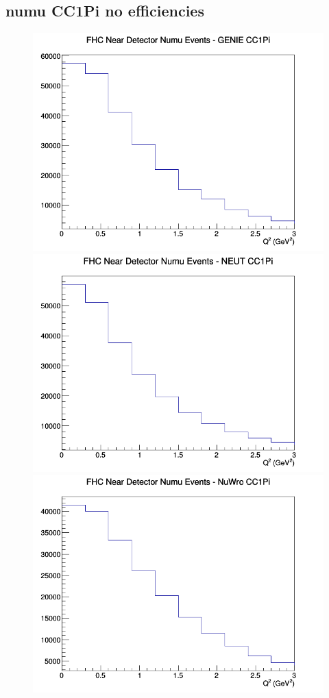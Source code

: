 \subsection{numu CC1Pi no efficiencies}
\begin{figure}[h]
\includegraphics[width=\linewidth]{Q2/nominal/CC1Pi_FHC_ND_numu_Q2_GENIE.png}
\endminipage
{}
\includegraphics[width=\linewidth]{Q2/nominal/CC1Pi_FHC_ND_numu_Q2_NEUT.png}
\endminipage
{}
\includegraphics[width=\linewidth]{Q2/nominal/CC1Pi_FHC_ND_numu_Q2_NuWro.png}

\end{figure}
